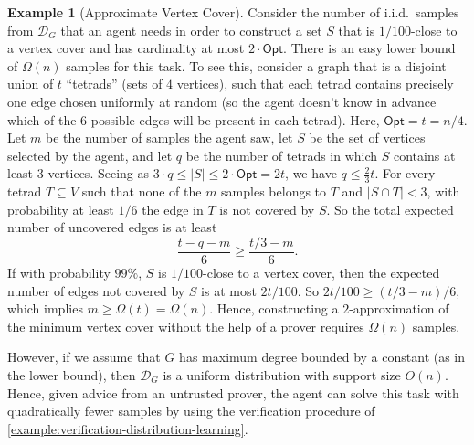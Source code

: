 \documentclass[11pt]{article}
\numberwithin{equation}{section}
\theoremstyle{definition}
\newtheorem{example}[theorem]{Example}
\theoremstyle{plain}
\theoremstyle{definition}\newtheorem{notation}[theorem]{Notation}\theoremstyle{plain}\raggedbottom
\newcommand{\roundBrackets}[1]{
	\mathopen{}\left(#1\right)\mathclose{}
}
\newcommand{\OmegaOf}[1]{\Omega\roundBrackets{#1}}
\newcommand{\BigO}[1]{O\roundBrackets{#1}}
\newcommand{\Opt}{\mathsf{Opt}}
\newcommand{\cD}{\mathcal{D}}
\newcommand{\1}{\mathds{1}}
\begin{document}
\begin{example}[Approximate Vertex Cover]
	Consider the number of i.i.d.\ samples from $\cD_G$ that an agent needs in order to construct a set $S$ that is $1/100$-close to a vertex cover and has cardinality at most $2\cdot\Opt$. There is an easy lower bound of $\OmegaOf{n}$ samples for this task. To see this, consider a graph that is a disjoint union of $t$ ``tetrads'' (sets of $4$ vertices), such that each tetrad contains precisely one edge chosen uniformly at random (so the agent doesn't know in advance which of the $6$ possible edges will be present in each tetrad). Here, $\Opt = t = n/4$. Let $m$ be the number of samples the agent saw, let $S$ be the set of vertices selected by the agent, and let $q$ be the number of tetrads in which $S$ contains at least $3$ vertices. Seeing as $3\cdot q \leq |S| \leq 2\cdot\Opt = 2t$, we have $q \leq \frac{2}{3}t$. For every tetrad $T \subseteq V$ such that none of the $m$ samples belongs to $T$ and $|S\cap T| < 3$, with probability at least $1/6$ the edge in $T$ is not covered by $S$. So the total expected number of uncovered edges is at least
	\[
		\frac{t - q - m}{6} \geq \frac{t/3 - m}{6}.
	\]
	If with probability $99\%$, $S$ is $1/100$-close to a vertex cover, then the expected number of edges not covered by $S$ is at most $2t/100$. So $2t/100 \geq (t/3 - m)/6$, which implies $m \geq \OmegaOf{t} = \OmegaOf{n}$. Hence, constructing a $2$-approximation of the minimum vertex cover without the help of a prover requires $\OmegaOf{n}$ samples.

	However, if we assume that $G$ has maximum degree bounded by a constant (as in the lower bound), then $\cD_G$ is a uniform distribution with support size $\BigO{n}$. Hence, given advice from an untrusted prover, the agent can solve this task with quadratically fewer samples by using the verification procedure of \cref{example:verification-distribution-learning}.


\end{example}
\end{document}
